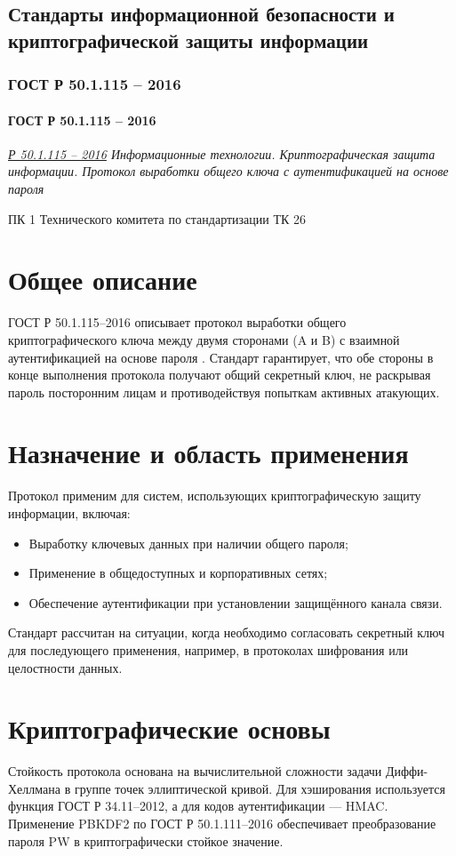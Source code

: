 \subsection{Стандарты информационной безопасности и криптографической защиты информации}

\subsubsection{ГОСТ Р 50.1.115 -- 2016}
\paragraph{ГОСТ Р 50.1.115 -- 2016}
\emph{\href{https://rst.gov.ru:8443/file-service/file/load/1699435168541}{Р 50.1.115 -- 2016}
Информационные технологии.
Криптографическая защита информации.
Протокол выработки общего ключа с аутентификацией на основе пароля}
\par
ПК 1 Технического комитета по стандартизации ТК 26
\section*{Общее описание}

ГОСТ Р 50.1.115–2016 описывает протокол выработки общего криптографического ключа между двумя сторонами (A и B) с
взаимной аутентификацией на основе пароля .
Стандарт гарантирует, что обе стороны в конце выполнения протокола получают общий секретный ключ, не
раскрывая пароль посторонним лицам и противодействуя попыткам активных атакующих.

\section*{Назначение и область применения}
\label{sec:scope}
Протокол применим для систем, использующих криптографическую защиту информации, включая:
\begin{itemize}
    \item Выработку ключевых данных при наличии общего пароля;
    \item Применение в общедоступных и корпоративных сетях;
    \item Обеспечение аутентификации при установлении защищённого канала связи.
\end{itemize}
Стандарт рассчитан на ситуации, когда необходимо согласовать секретный ключ
для последующего применения, например, в протоколах шифрования или целостности данных.

\section*{Криптографические основы}
\label{sec:crypto}
Стойкость протокола основана на вычислительной сложности задачи Диффи-Хеллмана в группе точек эллиптической кривой.
Для хэширования используется функция ГОСТ Р 34.11–2012, а для кодов аутентификации — HMAC.
Применение PBKDF2 по ГОСТ Р 50.1.111–2016 обеспечивает преобразование пароля PW в криптографически стойкое значение.

